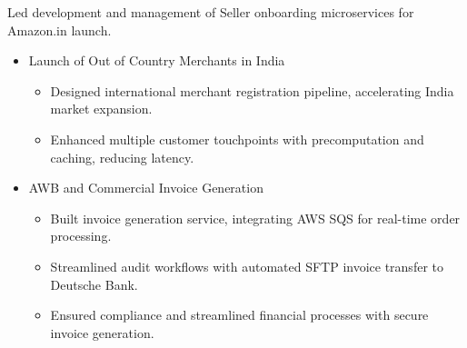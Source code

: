 {Led development and management of Seller onboarding microservices for Amazon.in launch.\newline{}
\begin{itemize}
\setlength\itemsep{1em}
    \item Launch of Out of Country Merchants in India 
        \begin{itemize}
            \item Designed international merchant registration pipeline, accelerating India market expansion.
            \item Enhanced multiple customer touchpoints with precomputation and caching, reducing latency.
        \end{itemize}
    \item AWB and Commercial Invoice Generation
        \begin{itemize}
            \item Built invoice generation service, integrating AWS SQS for real-time order processing.
            \item Streamlined audit workflows with automated SFTP invoice transfer to Deutsche Bank.
            \item Ensured compliance and streamlined financial processes with secure invoice generation.
        \end{itemize}
\end{itemize}}